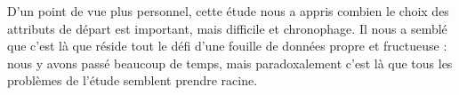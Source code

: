 D'un point de vue plus personnel, cette étude nous a appris combien le choix des attributs de départ est important, mais difficile et chronophage. Il nous a semblé que c'est là que réside tout le défi d'une fouille de données propre et fructueuse : nous y avons passé beaucoup de temps, mais paradoxalement c'est là que tous les problèmes de l'étude semblent prendre racine.

